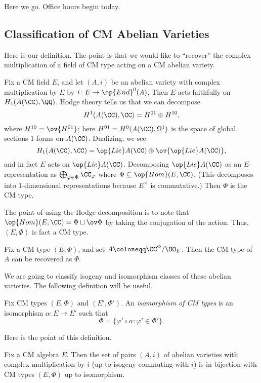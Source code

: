 \documentclass[../notes.tex]{subfiles}
\begin{document}
Here we go. Office hours begin today.

\subsection{Classification of CM Abelian Varieties}
Here is our definition. The point is that we would like to ``recover'' the complex multiplication of a field of CM type acting on a CM abelian variety.
\begin{definition}[CM type]
	Fix a CM field $E$, and let $(A,i)$ be an abelian variety with complex multiplication by $E$ by $i\colon E\to\op{End}^0(A)$. Then $E$ acts faithfully on $H_1(A(\CC),\QQ)$. Hodge theory tells us that we can decompose
	\[H^1(A(\CC),\CC)=H^{01}\oplus H^{10},\]
	where $H^{10}=\ov{H^{01}}$; here $H^{01}=H^0(A(\CC),\Omega^1)$ is the space of global sections $1$-forms on $A(\CC)$. Dualizing, we see
	\[H_1(A(\CC),\CC)=\op{Lie}A(\CC)\oplus\ov{\op{Lie}A(\CC)},\]
	and in fact $E$ acts on $\op{Lie}A(\CC)$. Decomposing $\op{Lie}A(\CC)$ as an $E$-representation as $\bigoplus_{\varphi\in\Phi}\CC_\varphi$ where $\Phi\subseteq\op{Hom}(E,\CC)$. (This decomposes into $1$-dimensional representations because $E^\times$ is commutative.) Then $\Phi$ is the CM type.
\end{definition}
\begin{remark}
	The point of using the Hodge decomposition is to note that $\op{Hom}(E,\CC)=\Phi\sqcup\ov\Phi$ by taking the conjugation of the action. Thus, $(E,\Phi)$ is fact a CM type.
\end{remark}
\begin{example}
	Fix a CM type $(E,\Phi)$, and set $A\coloneqq\CC^\Phi/\OO_E$. Then the CM type of $A$ can be recovered as $\Phi$.
\end{example}
We are going to classify isogeny and isomorphism classes of these abelian varieties. The following definition will be useful.
\begin{definition}
	Fix CM types $(E,\Phi)$ and $(E',\Phi')$. An \textit{isomorphism of CM types} is an isomorphism $\alpha\colon E\to E'$ such that
	\[\Phi=\{\varphi'\circ\alpha:\varphi'\in\Phi'\}.\]
\end{definition}
Here is the point of this definition.
\begin{proposition} \label{prop:classify-cm-ab-isog}
	Fix a CM algebra $E$. Then the set of pairs $(A,i)$ of abelian varieties with complex multiplication by $i$ (up to isogeny commuting with $i$) is in bijection with CM types $(E,\Phi)$ up to isomorphism.
\end{proposition}
\end{document}
